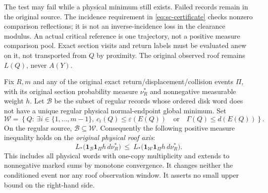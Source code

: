 \begin{scremark}
The test may fail while a physical minimum still exists. Failed records remain in the original source. The incidence requirement in \eqref{eq:sc-certificate} checks nonzero comparison reflections; it is not an inverse-incidence loss in the clearance modulus. An actual critical reference is one trajectory, not a positive measure comparison pool. Exact section visits and return labels must be evaluated anew on it, not transported from $Q$ by proximity. The original observed roof remains $L(Q)$, never $A(Y)$.
\end{scremark}

\begin{scproposition}\label{prop:sc-source}
Fix $R,m$ and any of the original exact return/displacement/collision events $\Pi$, with its original section probability measure $\nu_R^*$ and nonnegative measurable weight $h$. Let $\mathcal B$ be the subset of regular records whose ordered disk word does not have a unique regular physical normal-endpoint global minimum. Set
\begin{equation}\label{eq:sc-witness}
 \mathcal W=\left\{Q:\ \exists i\in\{1,\ldots,m-1\},\ c_i(Q)\le\varepsilon(E(Q))
       \quad\text{or}\quad\Gamma(Q)\le d(E(Q))\right\}.
\end{equation}
On the regular source, $\mathcal B\subseteq\mathcal W$. Consequently the following positive measure inequality holds on the \emph{original physical roof axis}:
\begin{equation}\label{eq:sc-source-order}
 L_*\bigl(\mathbf1_{\mathcal B}\mathbf1_\Pi h\,d\nu_R^*\bigr)
 \ \le\
 L_*\bigl(\mathbf1_{\mathcal W}\mathbf1_\Pi h\,d\nu_R^*\bigr).
\end{equation}
This includes all physical words with one-copy multiplicity and extends to nonnegative marked sums by monotone convergence. It changes neither the conditioned event nor any roof observation window. It asserts no small upper bound on the right-hand side.
\end{scproposition}
